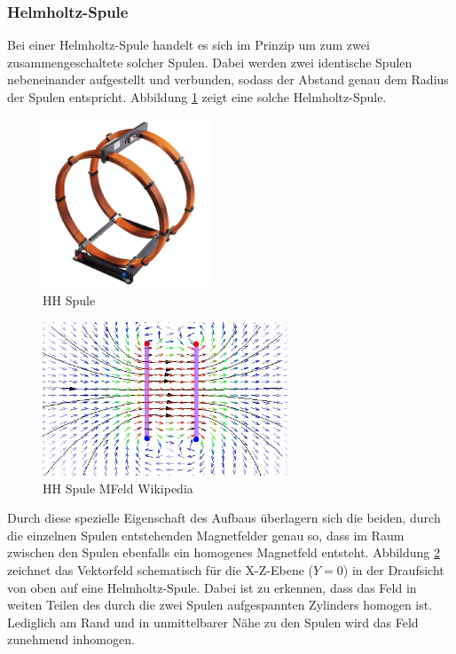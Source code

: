 \subsubsection{Helmholtz-Spule}
Bei einer Helmholtz-Spule handelt es sich im Prinzip um zum zwei zusammengeschaltete solcher Spulen. Dabei werden zwei identische Spulen nebeneinander aufgestellt und verbunden, sodass der Abstand genau dem Radius der Spulen entspricht. Abbildung \ref{img:Helmholtz} zeigt eine solche Helmholtz-Spule.\\

\begin{figure}[h!]
	\centering
	\includegraphics[width=0.45\textwidth]{images/Helmholtz.jpg}
	\caption{HH Spule}
	\label{img:Helmholtz}
\end{figure}

\begin{figure}[h!]
	\centering
	\includegraphics[width=0.65\textwidth]{images/Magnetfeld-Helmholtzspule.jpg}
	\caption{HH Spule MFeld Wikipedia}
	\label{img:Magnetfeld-Helmholtzspule}
\end{figure}

Durch diese spezielle Eigenschaft des Aufbaus überlagern sich die beiden, durch die einzelnen Spulen entstehenden Magnetfelder genau so, dass im Raum zwischen den Spulen ebenfalls ein homogenes Magnetfeld entsteht. Abbildung \ref{img:Magnetfeld-Helmholtzspule} zeichnet das Vektorfeld schematisch für die X-Z-Ebene ($Y=0$) in der Draufsicht von oben auf eine Helmholtz-Spule. Dabei ist zu erkennen, dass das Feld in weiten Teilen des durch die zwei Spulen aufgespannten Zylinders homogen ist. Lediglich am Rand und in unmittelbarer Nähe zu den Spulen wird das Feld zunehmend inhomogen.\\

